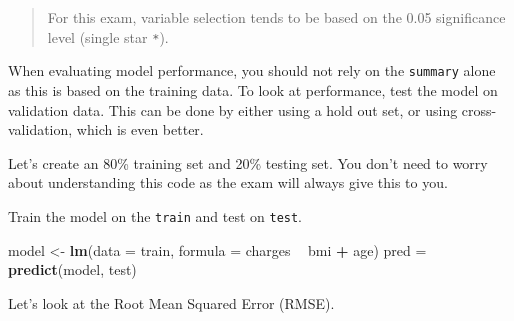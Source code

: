 \documentclass[openany]{book}
\newenvironment{Shaded}{\begin{snugshade}}{\end{snugshade}}
\newcommand{\CommentTok}[1]{\textcolor[rgb]{0.56,0.35,0.01}{\textit{#1}}}
\newcommand{\ControlFlowTok}[1]{\textcolor[rgb]{0.13,0.29,0.53}{\textbf{#1}}}
\newcommand{\DataTypeTok}[1]{\textcolor[rgb]{0.13,0.29,0.53}{#1}}
\newcommand{\DecValTok}[1]{\textcolor[rgb]{0.00,0.00,0.81}{#1}}
\newcommand{\FloatTok}[1]{\textcolor[rgb]{0.00,0.00,0.81}{#1}}
\newcommand{\KeywordTok}[1]{\textcolor[rgb]{0.13,0.29,0.53}{\textbf{#1}}}
\newcommand{\NormalTok}[1]{#1}
\newcommand{\OperatorTok}[1]{\textcolor[rgb]{0.81,0.36,0.00}{\textbf{#1}}}
\newcommand{\StringTok}[1]{\textcolor[rgb]{0.31,0.60,0.02}{#1}}
\begin{document}
\begin{quote}
For this exam, variable selection tends to be based on the 0.05 significance level (single star \texttt{*}).
\end{quote}

When evaluating model performance, you should not rely on the \texttt{summary} alone as this is based on the training data. To look at performance, test the model on validation data. This can be done by either using a hold out set, or using cross-validation, which is even better.

Let's create an 80\% training set and 20\% testing set. You don't need to worry about understanding this code as the exam will always give this to you.

\begin{Shaded}
\end{Shaded}

Train the model on the \texttt{train} and test on \texttt{test}.

\begin{Shaded}
\begin{Highlighting}[]
\NormalTok{model <-}\StringTok{ }\KeywordTok{lm}\NormalTok{(}\DataTypeTok{data =}\NormalTok{ train, }\DataTypeTok{formula =}\NormalTok{ charges }\OperatorTok{~}\StringTok{ }\NormalTok{bmi }\OperatorTok{+}\StringTok{ }\NormalTok{age)}
\NormalTok{pred =}\StringTok{ }\KeywordTok{predict}\NormalTok{(model, test)}
\end{Highlighting}
\end{Shaded}

Let's look at the Root Mean Squared Error (RMSE).

\begin{Shaded}
\end{Shaded}
\end{document}
